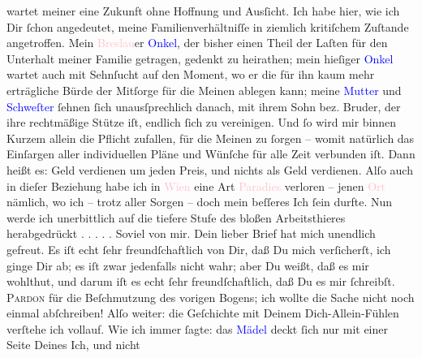 \documentclass[twoside=false,titlepage=false,open=any, parskip=never, fontsize=12pt, headings=small, chapterprefix=false, appendixprefix=false]{scrbook}
\newcommand{\dotsfive}{%
.\kern\ellipsisgap 
.\kern\ellipsisgap
.\kern\ellipsisgap
.\kern\ellipsisgap 
.\kern\ellipsisgap 
\relax}
\newcommand{\pbposition}{\depth}
\newcommand{\pb}{\nobreak\hspace{0pt}\raisebox{-0.1em}{\raisebox{\pbposition}{\textnormal{|}}}\nobreak\hspace{0pt}}
\begin{document}
               wartet meiner eine Zukunft ohne Hoffnung und Ausſicht. Ich habe hier, wie ich Dir
               ſchon angedeutet, meine Familienverhältniſſe in ziemlich kritiſchem Zuſtande
               angetroffen. Mein \textcolor{pink}{Breslau}{}\ledrightnote{\textcolor{pink}{Breslau}}er \textcolor{blue}{Onkel}{}, der bisher einen Theil der Laſten
               für den Unterhalt meiner Familie getragen, gedenkt zu heirathen; mein hieſiger \textcolor{blue}{Onkel}{} wartet
               auch mit Sehnſucht auf den Moment, wo er die für ihn kaum mehr erträgliche Bürde der
               Mitſorge für die Meinen ablegen kann; meine \textcolor{blue}{Mutter}{} und \textcolor{blue}{Schweſter}{} ſehnen ſich unausſprechlich danach, mit ihrem Sohn
               bez. Bruder, der ihre rechtmäßige Stütze iſt, endlich ſich {\pb}zu vereinigen. Und ſo wird mir binnen Kurzem allein
               die Pflicht zufallen, für die Meinen zu ſorgen – womit natürlich das Einſargen aller
               individuellen Pläne und Wünſche für alle Zeit verbunden iſt. Dann heißt es: Geld
               verdienen um jeden Preis, und nichts als Geld verdienen. Alſo auch in dieſer
               Beziehung habe ich in \textcolor{pink}{Wien}{}\ledrightnote{\textcolor{pink}{Wien}} eine Art \textcolor{pink}{Paradies}{} verloren – jenen \textcolor{pink}{Ort}{} nämlich, wo ich – trotz aller
               Sorgen – doch mein beſſeres Ich ſein durfte. Nun werde ich unerbittlich auf die
               tiefere Stufe des bloßen Arbeitsthieres herabgedrückt{\dotsfive}\pend
           \pstart
           Soviel von mir. Dein lieber Brief hat mich unendlich gefreut. Es iſt echt ſehr
               freundſchaftlich von Dir, daß Du mich verſicherſt, ich ginge Dir ab; es iſt zwar
               jedenfalls nicht wahr; aber Du weißt, daß es mir wohlthut, und darum iſt es echt ſehr
               freundſchaftlich, daß Du es mir ſchreibſt.\pend
           \pstart
           {\pb}\textsc{Pardon} für die Beſchmutzung des vorigen Bogens; ich wollte
               die Sache nicht noch einmal abſchreiben!\pend
           \pstart
           Alſo weiter: die Geſchichte mit Deinem Dich-Allein-Fühlen verſtehe ich vollauf. Wie
               ich immer ſagte: das \textcolor{blue}{Mädel}{} deckt ſich nur mit einer Seite Deines Ich, und nicht
\end{document}
